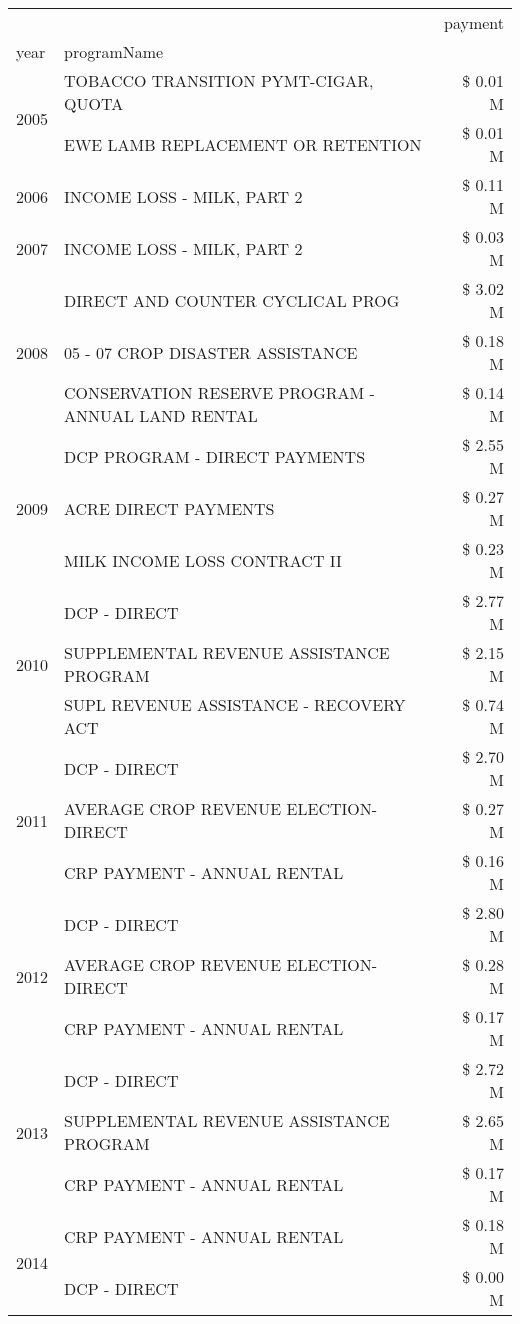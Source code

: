 \begin{tabular}{llr}
\toprule
 &  & payment \\
year & programName &  \\
\midrule
\multirow[t]{2}{*}{2005} & TOBACCO TRANSITION PYMT-CIGAR, QUOTA & \$ 0.01 M \\
 & EWE LAMB REPLACEMENT OR RETENTION & \$ 0.01 M \\
\cline{1-3}
2006 & INCOME LOSS - MILK, PART 2 & \$ 0.11 M \\
\cline{1-3}
2007 & INCOME LOSS - MILK, PART 2 & \$ 0.03 M \\
\cline{1-3}
\multirow[t]{3}{*}{2008} & DIRECT AND COUNTER CYCLICAL PROG & \$ 3.02 M \\
 & 05 - 07 CROP DISASTER ASSISTANCE & \$ 0.18 M \\
 & CONSERVATION RESERVE PROGRAM - ANNUAL LAND RENTAL & \$ 0.14 M \\
\cline{1-3}
\multirow[t]{3}{*}{2009} & DCP PROGRAM - DIRECT PAYMENTS & \$ 2.55 M \\
 & ACRE DIRECT PAYMENTS & \$ 0.27 M \\
 & MILK INCOME LOSS CONTRACT II & \$ 0.23 M \\
\cline{1-3}
\multirow[t]{3}{*}{2010} & DCP - DIRECT & \$ 2.77 M \\
 & SUPPLEMENTAL REVENUE ASSISTANCE PROGRAM & \$ 2.15 M \\
 & SUPL REVENUE ASSISTANCE - RECOVERY ACT & \$ 0.74 M \\
\cline{1-3}
\multirow[t]{3}{*}{2011} & DCP - DIRECT & \$ 2.70 M \\
 & AVERAGE CROP REVENUE ELECTION-DIRECT & \$ 0.27 M \\
 & CRP PAYMENT - ANNUAL RENTAL & \$ 0.16 M \\
\cline{1-3}
\multirow[t]{3}{*}{2012} & DCP - DIRECT & \$ 2.80 M \\
 & AVERAGE CROP REVENUE ELECTION-DIRECT & \$ 0.28 M \\
 & CRP PAYMENT - ANNUAL RENTAL & \$ 0.17 M \\
\cline{1-3}
\multirow[t]{3}{*}{2013} & DCP - DIRECT & \$ 2.72 M \\
 & SUPPLEMENTAL REVENUE ASSISTANCE PROGRAM & \$ 2.65 M \\
 & CRP PAYMENT - ANNUAL RENTAL & \$ 0.17 M \\
\cline{1-3}
\multirow[t]{2}{*}{2014} & CRP PAYMENT - ANNUAL RENTAL & \$ 0.18 M \\
 & DCP - DIRECT & \$ 0.00 M \\
\cline{1-3}

\end{tabular}
